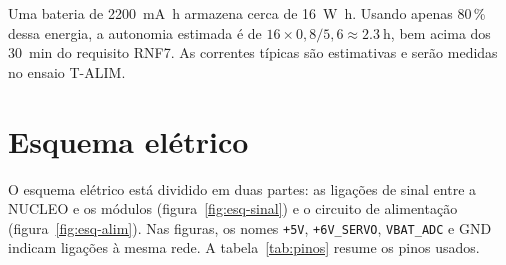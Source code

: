 Uma bateria de \SI{2200}{\milli\ampere\hour} armazena cerca de \SI{16}{\watt\hour}. Usando apenas 80\,\% dessa energia, a autonomia estimada é de $16 \times 0{,}8 / 5{,}6 \approx \SI{2.3}{\hour}$, bem acima dos \SI{30}{\minute} do requisito RNF7. As correntes típicas são estimativas e serão medidas no ensaio T-ALIM.

\section{Esquema elétrico}
O esquema elétrico está dividido em duas partes: as ligações de sinal entre a NUCLEO e os módulos (figura~\ref{fig:esq-sinal}) e o circuito de alimentação (figura~\ref{fig:esq-alim}). Nas figuras, os nomes \texttt{+5V}, \texttt{+6V\_SERVO}, \texttt{VBAT\_ADC} e GND indicam ligações à mesma rede. A tabela~\ref{tab:pinos} resume os pinos usados.

